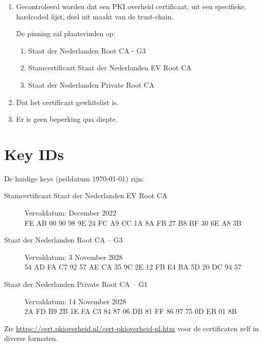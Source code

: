 \documentclass[11.0pt,twoside,openright]{report}
\begin{document}
\begin{enumerate}
\item	Gecontroleerd worden dat een PKI overheid certificaat, uit een specifieke, hardcoded lijst, deel uit maakt van de trust-chain.

De pinning zal plaatsvinden op:

\begin{enumerate}
\item Staat der Nederlanden Root CA - G3
\item Stamcertificaat Staat der Nederlanden EV Root CA 
\item Staat der Nederlanden Private Root CA 
\end{enumerate}
\item Dat het certificaat gewhitelist is.
\item Er is geen beperking qua diepte.
\end{enumerate}


\appendix
\chapter{Key IDs}
\label{keyid}

De huidige keys (peildatum \today) zijn:\\

\begin{description}
\item[Stamcertificaat Staat der Nederlanden EV Root CA]  Vervaldatum: December 2022 \\

FE AB 00 90 98 9E 24 FC A9 CC 1A 8A FB 27 B8 BF 30 6E A8 3B \\

\item[Staat der Nederlanden Root CA -- G3] Vervaldatum: 3 November 2028 \\

54 AD FA C7 92 57 AE CA 35 9C 2E 12 FB E4 BA 5D 20 DC 94 57 \\

\item[Staat der Nederlanden Private Root CA -- G1] Vervaldatum: 14 November 2028  \\

2A FD B9 2B 1E FA C3 84 87 06 DB 81 FF 86 97 75 0D EB 01 8B \\
\end{description}

Zie \url{https://cert.pkioverheid.nl/cert-pkioverheid-nl.htm} voor de certificaten zelf in diverse formaten.
\end{document}
